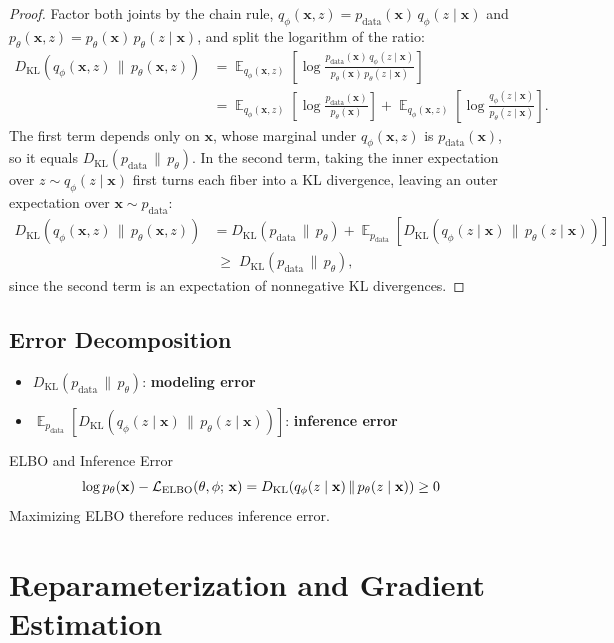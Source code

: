 \documentclass[11pt,a4paper]{article}
\DeclareMathOperator*{\E}{\mathbb{E}}
\newcommand{\bx}{\mathbf{x}} \newcommand{\by}{\mathbf{y}}
\newcommand{\KL}[2]{D_{\mathrm{KL}}\!\left(#1\,\|\,#2\right)}
\newcommand{\elbo}{\cL_{\mathrm{ELBO}}}
\newcommand{\pdata}{p_{\mathrm{data}}}
\begin{document}
\begin{proof}
Factor both joints by the chain rule, $q_\phi(\bx,z)=\pdata(\bx)\,q_\phi(z\mid \bx)$ and $p_\theta(\bx,z)=p_\theta(\bx)\,p_\theta(z\mid \bx)$, and split the logarithm of the ratio:
\begin{align*}
    \KL{q_\phi(\bx,z)}{p_\theta(\bx,z)}
    &= \E_{q_\phi(\bx,z)}\!\left[\log\frac{\pdata(\bx)\,q_\phi(z\mid \bx)}{p_\theta(\bx)\,p_\theta(z\mid \bx)}\right]\\
    &= \E_{q_\phi(\bx,z)}\!\left[\log\frac{\pdata(\bx)}{p_\theta(\bx)}\right]
     + \E_{q_\phi(\bx,z)}\!\left[\log\frac{q_\phi(z\mid \bx)}{p_\theta(z\mid \bx)}\right].
\end{align*}
The first term depends only on $\bx$, whose marginal under $q_\phi(\bx,z)$ is $\pdata(\bx)$, so it equals $\KL{\pdata}{p_\theta}$. In the second term, taking the inner expectation over $z\sim q_\phi(z\mid \bx)$ first turns each fiber into a KL divergence, leaving an outer expectation over $\bx\sim\pdata$:
\begin{align*}
    \KL{q_\phi(\bx,z)}{p_\theta(\bx,z)}
    &= \KL{\pdata}{p_\theta}
      + \E_{\pdata}\!\left[\KL{q_\phi(z\mid \bx)}{p_\theta(z\mid \bx)}\right]\\
    &\;\geq\;\KL{\pdata}{p_\theta},
\end{align*}
since the second term is an expectation of nonnegative KL divergences.
\end{proof}

\subsection{Error Decomposition}

\begin{itemize}[leftmargin=1.2em, itemsep=2pt]
    \item $\KL{\pdata}{p_\theta}$: \textbf{modeling error}
    \item $\E_{\pdata}\!\left[\KL{q_\phi(z\mid \bx)}{p_\theta(z\mid \bx)}\right]$: \textbf{inference error}
\end{itemize}

\begin{remark}{ELBO and Inference Error}{}
\[
    \log p_\theta(\bx) - \elbo(\theta,\phi;\,\bx)
    = \KL{q_\phi(z\mid \bx)}{p_\theta(z\mid \bx)} \geq 0
\]
Maximizing ELBO therefore reduces inference error.
\end{remark}

\section{Reparameterization and Gradient Estimation}\label{sec:reparam}
\end{document}
